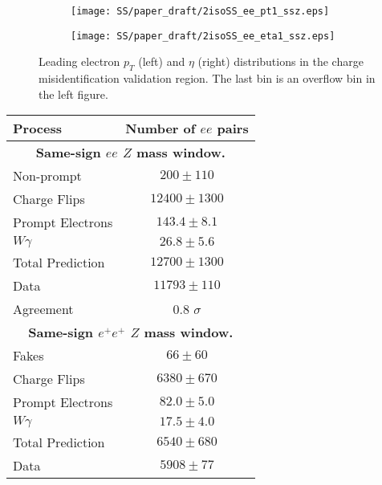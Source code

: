\begin{figure}[h]
\begin{subfigure}{.5\textwidth}
  \centering
  \texttt{[image: SS/paper\_draft/2isoSS\_ee\_pt1\_ssz.eps]}
\end{subfigure}%
\begin{subfigure}{.5\textwidth}
  \centering
  \texttt{[image: SS/paper\_draft/2isoSS\_ee\_eta1\_ssz.eps]}
\end{subfigure}
\caption{Leading electron $p_T$ (left) and $\eta$ (right) distributions in the charge misidentification validation region. The last bin is an overflow bin in the left figure.}
  \label{fig:charge_flip_CR_kinematics}
\end{figure}


\begin{table}[htbp]
\begin{center}
\begin{tabular}{l|c}
\hline
Process & Number of $ee$ pairs \\\hline\hline
%
\multicolumn{2}{c}{\textbf{Same-sign $ee$ $Z$ mass window.}} \\\hline 
        Non-prompt      & $200 \pm 110$ \\[+0.05in]
        Charge Flips & $12400 \pm 1300$ \\[+0.05in]
        Prompt Electrons & $143.4 \pm 8.1$ \\[+0.05in]
        $W\gamma$  & $26.8 \pm 5.6$ \\[+0.05in]
            \hline
        Total Prediction & $12700 \pm 1300$ \\[+0.05in]
            \hline
        Data       &       $11793 \pm 110$ \\[+0.05in]
            \hline
        Agreement  &      0.8 $\sigma$ \\[+0.05in]
\hline \hline
\multicolumn{2}{c}{\textbf{Same-sign $e^{+}e^{+}$ $Z$ mass window.}} \\\hline 
        Fakes      & $66 \pm 60$ \\[+0.05in]
        Charge Flips & $6380 \pm 670$ \\[+0.05in]
        Prompt Electrons & $82.0 \pm 5.0$ \\[+0.05in]
        $W\gamma$  & $17.5 \pm 4.0$ \\[+0.05in]
            \hline
        Total Prediction & $6540 \pm 680$ \\[+0.05in]
            \hline
        Data       &        $5908 \pm 77$ \\[+0.05in]

\end{tabular}
\end{center}
\end{table}
